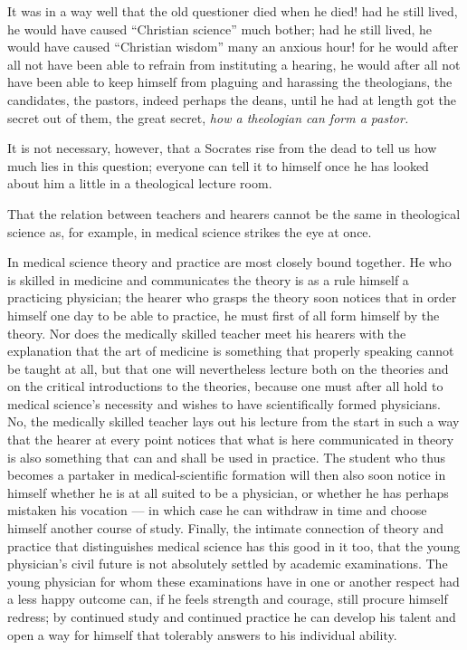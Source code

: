 \documentclass[12pt,a4paper]{book}
\begin{document}
It was in a way well that the old questioner died when he died! had he still lived, he would have
caused ``Christian science'' much bother; had he still lived, he would have caused ``Christian
wisdom'' many an anxious hour! for he would after all not have been able to refrain from
instituting a hearing, he would after all not have been able to keep himself from plaguing and
harassing the theologians, the candidates, the pastors, indeed perhaps the deans, until he had at
length got the secret out of them, the great secret,
\emph{how a theologian can form a pastor.}

It is not necessary, however, that a Socrates rise from the dead to tell us how much lies in this
question; everyone can tell it to himself once he has looked about him a little in a theological
lecture room.

That the relation between teachers and hearers cannot be the same in theological science as, for
example, in medical science strikes the eye at once.

In medical science theory and practice are most closely bound together. He who is skilled in
medicine and communicates the theory is as a rule himself a practicing physician; the hearer who
grasps the theory soon notices that in order himself one day to be able to practice, he must
first of all form himself by the theory. Nor does the medically skilled teacher meet his hearers
with the explanation that the art of medicine is something that properly speaking cannot be
taught at all, but that one will nevertheless lecture both on the theories and on the critical
introductions to the theories, because one must after all hold to medical science's necessity and
wishes to have scientifically formed physicians. No, the medically skilled teacher lays out his
lecture from the start in such a way that the hearer at every point notices that what is here
communicated in theory is also something that can and shall be used in practice. The student who
thus becomes a partaker in medical-scientific formation will
then also soon notice in himself whether he is at all suited to be a physician, or whether he has
perhaps mistaken his vocation --- in which case he can withdraw in time and choose himself another
course of study. Finally, the intimate connection of theory and practice that distinguishes
medical science has this good in it too, that the young physician's civil future is not absolutely
settled by academic examinations. The young physician for whom these examinations have in one or
another respect had a less happy outcome can, if he feels strength and courage, still procure
himself redress; by continued study and continued practice he can develop his talent and open a
way for himself that tolerably answers to his individual ability.
\end{document}
